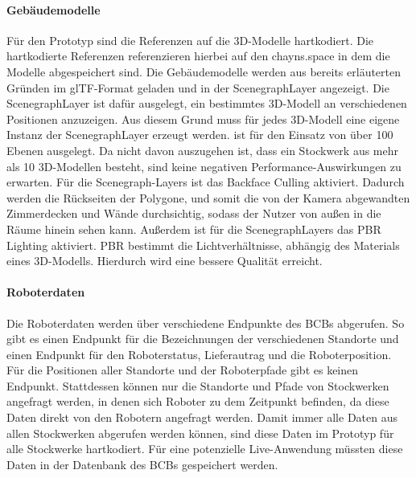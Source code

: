 \paragraph{Gebäudemodelle}
Für den Prototyp sind die Referenzen auf die 3D-Modelle hartkodiert. Die hartkodierte Referenzen referenzieren hierbei auf den chayns.space in dem die Modelle abgespeichert sind. Die Gebäudemodelle werden aus bereits erläuterten Gründen im \ac{glTF}-Format geladen und in der ScenegraphLayer angezeigt. Die ScenegraphLayer ist dafür ausgelegt, ein bestimmtes 3D-Modell an verschiedenen Positionen anzuzeigen. Aus diesem Grund muss für jedes 3D-Modell eine eigene Instanz der ScenegraphLayer erzeugt werden. 
\deckgl{} ist für den Einsatz von über 100 Ebenen ausgelegt. Da nicht davon auszugehen ist, dass ein Stockwerk aus mehr als 10 3D-Modellen besteht, sind keine negativen Performance-Auswirkungen zu erwarten.
Für die Scenegraph-Layers ist das Backface Culling aktiviert. Dadurch werden die Rückseiten der Polygone, und somit die von der Kamera abgewandten Zimmerdecken und Wände durchsichtig, sodass der Nutzer von außen in die Räume hinein sehen kann. 
Außerdem ist für die ScenegraphLayers das \ac{PBR} Lighting aktiviert. \ac{PBR} bestimmt die Lichtverhältnisse, abhängig des Materials eines 3D-Modells. Hierdurch wird eine bessere Qualität erreicht.

\paragraph{Roboterdaten}
Die Roboterdaten werden über verschiedene Endpunkte des \ac{BCB}s abgerufen. So gibt es einen Endpunkt für die Bezeichnungen der verschiedenen Standorte und einen Endpunkt für den Roboterstatus, Lieferautrag und die Roboterposition. Für die Positionen aller Standorte und der Roboterpfade gibt es keinen Endpunkt. Stattdessen können nur die Standorte und Pfade von Stockwerken angefragt werden, in denen sich Roboter zu dem Zeitpunkt befinden, da diese Daten direkt von den Robotern angefragt werden. Damit immer alle Daten aus allen Stockwerken abgerufen werden können, sind diese Daten im Prototyp für alle Stockwerke hartkodiert. Für eine potenzielle Live-Anwendung müssten diese Daten in der Datenbank des \ac{BCB}s gespeichert werden.

